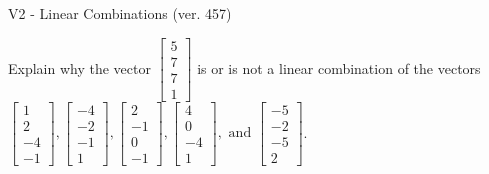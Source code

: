 \begin{exercise}
  \begin{exerciseTitle}V2 - Linear Combinations (ver. 457)\end{exerciseTitle}
  \begin{exerciseStatement}
    Explain why the vector \(\left[\begin{array}{c}
5 \\
7 \\
7 \\
1
\end{array}\right]\)  is or is not a linear 
	combination of the vectors \(\left[\begin{array}{c}
1 \\
2 \\
-4 \\
-1
\end{array}\right] , \left[\begin{array}{c}
-4 \\
-2 \\
-1 \\
1
\end{array}\right] , \left[\begin{array}{c}
2 \\
-1 \\
0 \\
-1
\end{array}\right] , \left[\begin{array}{c}
4 \\
0 \\
-4 \\
1
\end{array}\right] , \text{ and } \left[\begin{array}{c}
-5 \\
-2 \\
-5 \\
2
\end{array}\right]\).
	



\end{exerciseStatement}
\end{exercise}

